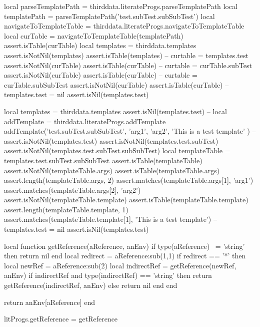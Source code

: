 {{
\startLuaTest
local parseTemplatePath = thirddata.literateProgs.parseTemplatePath
local templatePath = parseTemplatePath('test.subTest.subSubTest')
local navigateToTemplateTable = thirddata.literateProgs.navigateToTemplateTable
local curTable = navigateToTemplateTable(templatePath)
assert.isTable(curTable)
local templates = thirddata.templates
assert.isNotNil(templates)
assert.isTable(templates)
--
curtable = templates.test
assert.isNotNil(curTable)
assert.isTable(curTable)
--
curtable = curTable.subTest
assert.isNotNil(curTable)
assert.isTable(curTable)
--
curtable = curTable.subSubTest
assert.isNotNil(curTable)
assert.isTable(curTable)
--
templates.test = nil
assert.isNil(templates.test)
\stopLuaTest
\stopTestCase

\startLuaTest
local templates = thirddata.templates
assert.isNil(templates.test)
--
local addTemplate = thirddata.literateProgs.addTemplate
addTemplate('test.subTest.subSubTest',
  { 'arg1', 'arg2'},
  'This is a test template'
)
--
assert.isNotNil(templates.test)
assert.isNotNil(templates.test.subTest)
assert.isNotNil(templates.test.subTest.subSubTest)
local templateTable = templates.test.subTest.subSubTest
assert.isTable(templateTable)
assert.isNotNil(templateTable.args)
assert.isTable(templateTable.args)
assert.length(templateTable.args, 2)
assert.matches(templateTable.args[1], 'arg1')
assert.matches(templateTable.args[2], 'arg2')
assert.isNotNil(templateTable.template)
assert.isTable(templateTable.template)
assert.length(templateTable.template, 1)
assert.matches(templateTable.template[1], 'This is a test template')
--
templates.test = nil
assert.isNil(templates.test)
\stopLuaTest
\stopTestCase

\stopTestSuite

\startTestSuite[renderer]


\startLuaCode
local function getReference(aReference, anEnv)
  if type(aReference) ~= 'string' then return nil end
  local redirect = aReference:sub(1,1)
  if redirect == '*' then
    local newRef = aReference:sub(2)
    local indirectRef = getReference(newRef, anEnv)
    if indirectRef and type(indirectRef) == 'string' then
      return getReference(indirectRef, anEnv)
    else
      return nil
    end
  end

  return anEnv[aReference]
end

litProgs.getReference = getReference
\stopLuaCode


}}
